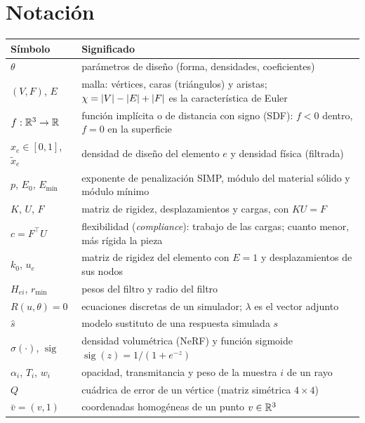 \documentclass[11pt,a4paper,twoside,openany]{book}
\newcommand{\xf}{\tilde{x}}
\newcommand{\Emin}{E_{\min}}
\newcommand{\rmin}{r_{\min}}
\newcommand{\sigm}{\operatorname{sig}}
\newcommand{\T}{\top}
\begin{document}
\section*{Notación}
\begin{center}\small
\begin{tabularx}{\textwidth}{@{}l>{\raggedright\arraybackslash}X@{}}
\toprule
Símbolo & Significado \\
\midrule
$\theta$ & parámetros de diseño (forma, densidades, coeficientes) \\
$(V,F)$, $E$ & malla: vértices, caras (triángulos) y aristas; $\chi=\lvert V\rvert-\lvert E\rvert+\lvert F\rvert$ es la característica de Euler \\
$f:\mathbb{R}^3\to\mathbb{R}$ & función implícita o de distancia con signo (SDF): $f<0$ dentro, $f=0$ en la superficie \\
$x_e\in[0,1]$, $\xf_e$ & densidad de diseño del elemento $e$ y densidad física (filtrada) \\
$p$, $E_0$, $\Emin$ & exponente de penalización SIMP, módulo del material sólido y módulo mínimo \\
$K$, $U$, $F$ & matriz de rigidez, desplazamientos y cargas, con $KU=F$ \\
$c=F^\T U$ & flexibilidad (\emph{compliance}): trabajo de las cargas; cuanto menor, más rígida la pieza \\
$k_0$, $u_e$ & matriz de rigidez del elemento con $E=1$ y desplazamientos de sus nodos \\
$H_{ei}$, $\rmin$ & pesos del filtro y radio del filtro \\
$R(u,\theta)=0$ & ecuaciones discretas de un simulador; $\lambda$ es el vector adjunto \\
$\hat s$ & modelo sustituto de una respuesta simulada $s$ \\
$\sigma(\cdot)$, $\sigm$ & densidad volumétrica (NeRF) y función sigmoide $\sigm(z)=1/(1+e^{-z})$ \\
$\alpha_i$, $T_i$, $w_i$ & opacidad, transmitancia y peso de la muestra $i$ de un rayo \\
$Q$ & cuádrica de error de un vértice (matriz simétrica $4\times 4$) \\
$\bar v=(v,1)$ & coordenadas homogéneas de un punto $v\in\mathbb{R}^3$ \\
\bottomrule
\end{tabularx}
\end{center}


\tableofcontents

\mainmatter







\backmatter

\end{document}
